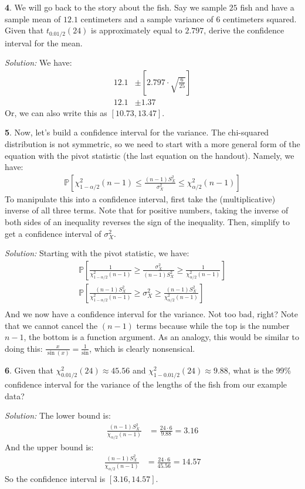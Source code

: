 \documentclass{tufte-handout}
\begin{document}
\textbf{4}. We will go back to the story about the fish. Say we sample $25$ fish and
have a sample mean of $12.1$ centimeters and a sample variance of $6$
centimeters squared. Given that $t_{0.01/2}(24)$ is approximately equal
to $2.797$, derive the confidence interval for the mean.


\textit{Solution:} We have:
\begin{align*}
12.1 &\pm \left[ 2.797 \cdot \sqrt{\frac{6}{25}} \right] \\
12.1 &\pm 1.37
\end{align*}
Or, we can also write this as $[10.73, 13.47]$.

\textbf{5}. Now, let's build a confidence interval for the variance. The chi-squared 
distribution is not symmetric, so we need to start with a more general
form of the equation with the pivot statistic (the last equation on the
handout). Namely, we have:
\begin{align*}
\mathbb{P}\left[ \chi^2_{1 - \alpha/2}(n-1) \leq \frac{(n-1)S^2_X}{\sigma_X^2} \leq \chi^2_{\alpha/2}(n-1) \right]
\end{align*}
To manipulate this into a confidence interval, first take the (multiplicative)
inverse of all three terms. Note that for positive numbers, taking the inverse
of both sides of an inequality reverses the sign of the inequality. Then,
simplify to get a confidence interval of $\sigma_X^2$.

\textit{Solution:} Starting with the pivot statistic, we have:
\begin{align*}
\mathbb{P}\left[ \frac{1}{\chi^2_{1 - \alpha/2}(n-1)} \geq \frac{\sigma_X^2}{(n-1)S^2_X} \geq \frac{1}{\chi^2_{\alpha/2}(n-1)} \right] \\
\mathbb{P}\left[ \frac{(n-1)S^2_X}{\chi^2_{1 - \alpha/2}(n-1)} \geq \sigma_X^2 \geq \frac{(n-1)S^2_X}{\chi^2_{\alpha/2}(n-1)} \right] \\
\end{align*}
And we now have a confidence interval for the variance. Not too bad, right?
Note that we cannot cancel the $(n-1)$ terms because while the top is the number
$n-1$, the bottom is a function argument. As an analogy, this would be similar 
to doing this: $\frac{x}{\sin(x)} = \frac{1}{\sin}$, which is clearly nonsensical.

\textbf{6}. Given that $\chi^2_{0.01/2}(24) \approx 45.56$ and $\chi^2_{1-0.01/2}(24) \approx 9.88$,
what is the 99\% confidence interval for the variance of the lengths of the
fish from our example data?


\textit{Solution:} The lower bound is:
\begin{align*}
\frac{(n-1)S^2_X}{\chi_{\alpha/2}(n-1)} &= \frac{24 \cdot 6}{9.88} = 3.16
\end{align*}
And the upper bound is:
\begin{align*}
\frac{(n-1)S^2_X}{\chi_{\alpha/2}(n-1)} &= \frac{24 \cdot 6}{45.56} = 14.57
\end{align*}
So the confidence interval is $[3.16, 14.57]$.
\end{document}
